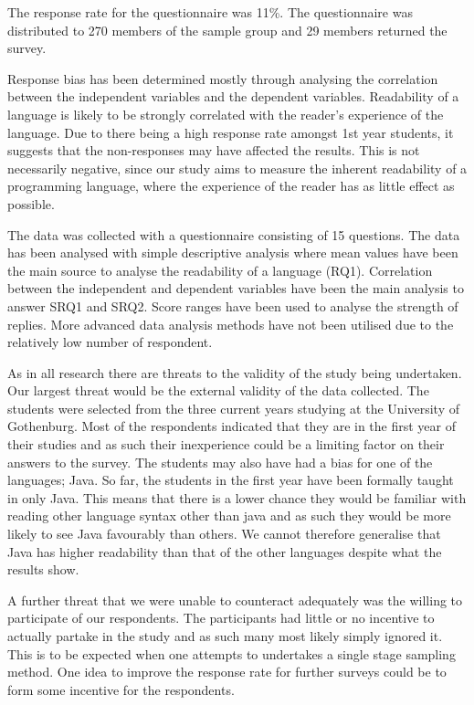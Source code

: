 \documentclass[times, 10pt,twocolumn]{IEEEtran}
\begin{document}
The response rate for the questionnaire was 11\%. The questionnaire was distributed to 270 members of the sample group and 29 members returned the survey.
\newline

Response bias has been determined mostly through analysing the correlation between the independent variables and the dependent variables. Readability of a language is likely to be strongly correlated with the reader's experience of the language. Due to there being a high response rate amongst 1st year students, it suggests that the non-responses may have affected the results. This is not necessarily negative, since our study aims to measure the inherent readability of a programming language, where the experience of the reader has as little effect as possible.
\newline

The data was collected with a questionnaire consisting of 15 questions. The data has been analysed with simple descriptive analysis where mean values have been the main source to analyse the readability of a language (RQ1). Correlation between the independent and dependent variables have been the main analysis to answer SRQ1 and SRQ2. Score ranges have been used to analyse the strength of replies. More advanced data analysis methods have not been utilised due to the relatively low number of respondent. 

As in all research there are threats to the validity of the study being undertaken. Our largest threat would be the external validity of the data collected. The students were selected from the three current years studying at the University of Gothenburg. Most of the respondents indicated that they are in the first year of their studies and as such their inexperience could be a limiting factor on their answers to the survey. The students may also have had a bias for one of the languages; Java. So far, the students in the first year have been formally taught in only Java. This means that there is a lower chance they would be familiar with reading other language syntax other than java and as such they would be more likely to see Java favourably than others. We cannot therefore generalise that Java has higher readability than that of the other languages despite what the results show. 
\newline

A further threat that we were unable to counteract adequately was the willing to participate of our respondents. The participants had little or no incentive to actually partake in the study and as such many most likely simply ignored it. This is to be expected when one attempts to undertakes a single stage sampling method. One idea to improve the response rate for further surveys could be to form some incentive for the respondents.
\newline
\end{document}
